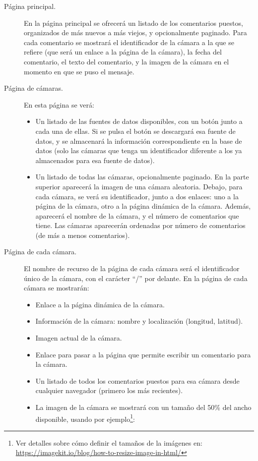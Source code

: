 \begin{description}
\item[Página principal.] En la página principal se ofrecerá un listado de los comentarios puestos, organizados de más nuevos a más viejos, y opcionalmente paginado. Para cada comentario se mostrará el identificador de la cámara a la que se refiere (que será un enlace a la página de la cámara), la fecha del comentario, el texto del comentario, y la imagen de la cámara en el momento en que se puso el mensaje.

\item[Página de cámaras.] En esta página se verá:

  \begin{itemize}
  \item Un listado de las fuentes de datos disponibles, con un botón junto a cada una de ellas. Si se pulsa el botón se descargará esa fuente de datos, y se almacenará la información correspondiente en la base de datos (solo las cámaras que tenga un identificador diferente a los ya almacenados para esa fuente de datos).
  \item Un listado de todas las cámaras, opcionalmente paginado. En la parte superior aparecerá la imagen de una cámara aleatoria. Debajo, para cada cámara, se verá su identificador, junto a dos enlaces: uno a la página de la cámara, otro a la página dinámica de la cámara. Además, aparecerá el nombre de la cámara, y el número de comentarios que tiene. Las cámaras aparecerán ordenadas por número de comentarios (de más a menos comentarios).
  \end{itemize}

\item[Página de cada cámara.] El nombre de recurso de la página de cada cámara será el identificador único de la cámara, con el carácter ``/'' por delante. En la página de cada cámara se mostrarán:
  \begin{itemize}
  \item Enlace a la página dinámica de la cámara.
  \item Información de la cámara: nombre y localización (longitud, latitud).
  \item Imagen actual de la cámara.
  \item Enlace para pasar a la página que permite escribir un comentario para la cámara.
  \item Un listado de todos los comentarios puestos para esa cámara desde cualquier navegador (primero los más recientes).
  \item La imagen de la cámara se mostrará con un tamaño del 50\% del ancho disponible, usando por ejemplo\footnote{Ver detalles sobre cómo definir el tamaños de la imágenes en: \\ \url{https://imagekit.io/blog/how-to-resize-image-in-html/}}:


\end{itemize}
\end{description}
